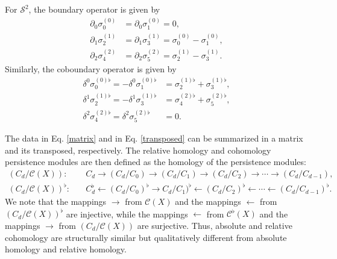 \begin{example}{\cite[\S 2.6, Example]{de2011dualities}}
	For $\mathcal{S}^{2}$, the boundary operator is given by
	\begin{align}
		\label{matrix}
		\partial_0\sigma^{(0)}_{0} & = \partial_0\sigma^{(0)}_{1} = 0, \nonumber\\
		\partial_1\sigma_{2}^{(1)} & = \partial_1\sigma_{3}^{(1)} = \sigma_{0}^{(0)}-\sigma_{1}^{(0)}, \nonumber\\
		\partial_2\sigma_{4}^{(2)} & = \partial_2\sigma_{5}^{(2)} = \sigma_{2}^{(1)} - \sigma_{3}^{(1)}.
	\end{align}
	Similarly, the coboundary operator is given by
	\begin{align}
		\label{transposed}
		\delta^0\sigma_{0}^{(0)\flat} = -\delta^0\sigma_{1}^{(0)\flat} & = \sigma_{2}^{(1)\flat} + \sigma_{3}^{(1)\flat}, \nonumber\\
		\delta^1\sigma_{2}^{(1)\flat} = -\delta^1\sigma_{3}^{(1)\flat} & = \sigma_{4}^{(2)\flat} + \sigma_{5}^{(2)\flat}, \nonumber\\
		\delta^2\sigma_{4}^{(2)\flat} = \delta^2\sigma_{5}^{(2)\flat}  & = 0.
	\end{align}
\end{example}

The data in Eq. \ref{matrix} and in Eq. \ref{transposed} can be summarized in a matrix and its transposed, respectively. The relative homology and cohomology persistence modules are then defined as the homology of the persistence modules:
	\begin{align*}
		(C_{d}/\mathcal{C}(X)):         & \quad C_{d} \rightarrow (C_{d}/C_{0}) \to (C_{d}/C_{1}) \rightarrow (C_{d}/C_{2}) \rightarrow \cdots \rightarrow (C_{d}/C_{d-1}),                             \\
		(C_{d}/\mathcal{C}(X))^{\flat}: & \quad C_{d}^{\flat} \leftarrow (C_{d}/C_{0})^{\flat} \to C_{d}/C_{1})^{\flat} \leftarrow (C_{d}/C_{2})^{\flat} \leftarrow \cdots \leftarrow (C_{d}/C_{d-1})^{\flat}.
	\end{align*}
We note that the mappings $\rightarrow$ from $\mathcal{C}(X)$ and the mappings $\leftarrow$ from $(C_{d}/\mathcal{C}(X))^{\flat}$ are injective, while the mappings $\leftarrow$ from $\mathcal{C}^{\flat}(X)$ and the mappings $\rightarrow$ from $(C_{d}/\mathcal{C}(X))$ are surjective. Thus, absolute and relative cohomology are structurally similar but qualitatively different from absolute homology and relative homology.

